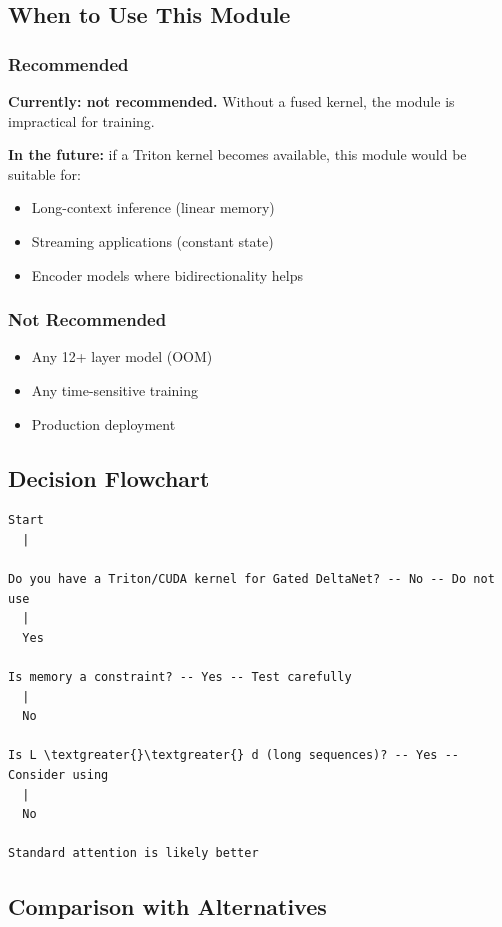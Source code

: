 \subsection{When to Use This Module}

\subsubsection{Recommended}

\textbf{Currently: not recommended.} Without a fused kernel, the module is 
impractical for training.

\textbf{In the future:} if a Triton kernel becomes available, this module 
would be suitable for:
\begin{itemize}
\item Long-context inference (linear memory)
\item Streaming applications (constant state)
\item Encoder models where bidirectionality helps

\end{itemize}
\subsubsection{Not Recommended}

\begin{itemize}
\item Any 12+ layer model (OOM)
\item Any time-sensitive training
\item Production deployment

\end{itemize}
\subsection{Decision Flowchart}

\begin{lstlisting}
Start
  |
   
Do you have a Triton/CUDA kernel for Gated DeltaNet? -- No -- Do not use
  |
  Yes
   
Is memory a constraint? -- Yes -- Test carefully
  |
  No
   
Is L \textgreater{}\textgreater{} d (long sequences)? -- Yes -- Consider using
  |
  No
   
Standard attention is likely better
\end{lstlisting}

\subsection{Comparison with Alternatives}

